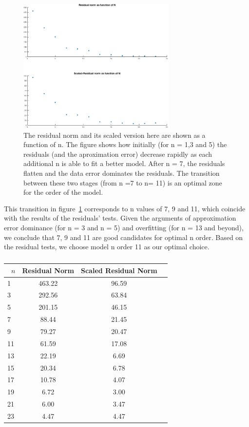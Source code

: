 \begin{figure}[htbp]
\centering
\includegraphics[width=0.7\textwidth]{../img/figure5}
\caption{The residual norm and its scaled version here are shown as a function of n. The figure shows how initially (for n = 1,3 and 5) the residuals (and the aproximation error) decrease rapidly as each additional n is able to fit a better model. After n = 7, the residuals flatten and the data error dominates the residuals. The transition between these two stages (from n =7 to n= 11) is an optimal zone for the order of the model.}
\label{fig:figure5}
\end{figure}
 
This transition in figure~\ref{fig:figure5} corresponds to n values of 7, 9 and 11, which coincide with the results of the residuals' tests. Given the arguments of approximation error dominance (for n = 3 and n = 5) and overfitting (for n = 13 and beyond), we conclude that 7, 9 and 11 are good candidates for optimal n order. Based on the residual tests, we choose model n order 11 as our optimal choice. 

\begin{table}[htbp]
\centering
\begin{tabular}{l|ccc}
\hline \hline 
\ $n$ & Residual Norm & Scaled Residual Norm \\ \hline
1 & 463.22	& 96.59 \\
3 & 292.56  & 63.84	 \\
5 & 201.15  & 46.15  \\
7 &  88.44  & 21.45  \\
9 &  79.27  & 20.47  \\
11 & 61.59	& 17.08 \\
13 & 22.19	& 6.69 \\
15 & 20.34	& 6.78 \\
17 & 10.78	& 4.07 \\
19 &  6.72  & 3.00 \\
21 &  6.00  & 3.47 \\
23 &  4.47  & 4.47 \\ 
\hline \hline
\end{tabular}
\caption{}
\label{tab:Table1}
\end{table} 

